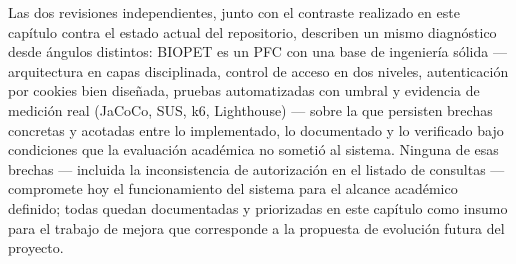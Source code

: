 Las dos revisiones independientes, junto con el contraste realizado en este
cap\'itulo contra el estado actual del repositorio, describen un mismo
diagn\'ostico desde \'angulos distintos: BIOPET es un PFC con una base de
ingenier\'ia s\'olida --- arquitectura en capas disciplinada, control de
acceso en dos niveles, autenticaci\'on por cookies bien dise\~nada, pruebas
automatizadas con umbral y evidencia de medici\'on real (JaCoCo, SUS, k6,
Lighthouse) --- sobre la que persisten brechas concretas y acotadas entre lo
implementado, lo documentado y lo verificado bajo condiciones que la
evaluaci\'on acad\'emica no someti\'o al sistema. Ninguna de esas brechas
--- incluida la inconsistencia de autorizaci\'on en el listado de consultas
--- compromete hoy el funcionamiento del sistema para el alcance
acad\'emico definido; todas quedan documentadas y priorizadas en este
cap\'itulo como insumo para el trabajo de mejora que corresponde a la
propuesta de evoluci\'on futura del proyecto.
